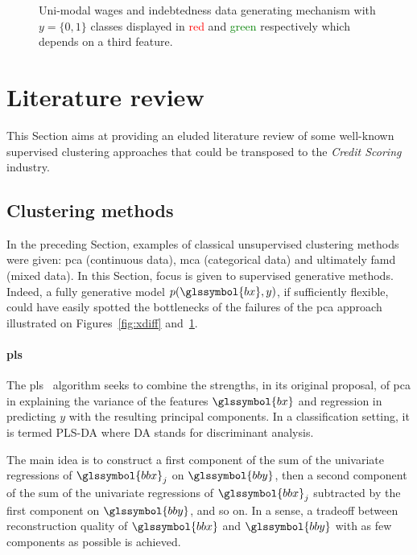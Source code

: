 \begin{figure}
\caption{\label{fig:ydiff} Uni-modal wages and indebtedness data generating mechanism with $y = \{0,1\}$ classes displayed in \textcolor{red}{red} and \textcolor{green}{green} respectively which depends on a third feature.}
\end{figure}








\section{Literature review} \label{sec:literature}

This Section aims at providing an eluded literature review of some well-known supervised clustering approaches that could be transposed to the \textit{Credit Scoring} industry.

\subsection{Clustering methods}

In the preceding Section, examples of classical unsupervised clustering methods were given: \gls{pca} (continuous data), \gls{mca} (categorical data) and ultimately \gls{famd} (mixed data). In this Section, focus is given to supervised generative methods. Indeed, a fully generative model $p(\glssymbol{bx},y)$, if sufficiently flexible, could have easily spotted the bottlenecks of the failures of the \gls{pca} approach illustrated on Figures~\ref{fig:xdiff} and~\ref{fig:ydiff}.

\paragraph{\gls{pls}}

The \gls{pls}~\cite{wold1984collinearity} algorithm seeks to combine the strengths, in its original proposal, of \gls{pca} in explaining the variance of the features $\glssymbol{bx}$ and regression in predicting $y$ with the resulting principal components. In a classification setting, it is termed PLS-DA where DA stands for discriminant analysis.

The main idea is to construct a first component of the sum of the univariate regressions of $\glssymbol{bbx}_j$ on $\glssymbol{bby}$, then a second component of the sum of the univariate regressions of $\glssymbol{bbx}_j$ subtracted by the first component on $\glssymbol{bby}$, and so on. In a sense, a tradeoff between reconstruction quality of $\glssymbol{bbx}$ and $\glssymbol{bby}$ with as few components as possible is achieved.

